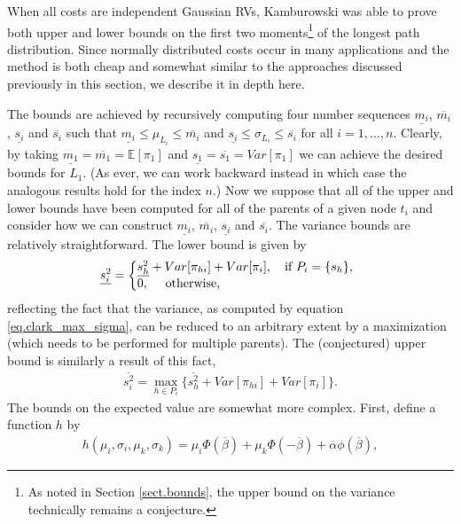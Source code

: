 \documentclass[12pt]{article}
\def\E{\mathbb{E}}
\begin{document}
When all costs are independent Gaussian RVs, Kamburowski was able to prove both upper and lower bounds on the first two moments\footnote{As noted in Section \ref{sect.bounds}, the upper bound on the variance technically remains a conjecture.} of the longest path distribution. Since normally distributed costs occur in many applications and the method is both cheap and somewhat similar to the approaches discussed previously in this section, we describe it in depth here.

The bounds are achieved by recursively computing four number sequences $\underline{m_i}$, $\overline{m_i}$, $\underline{s_i}$ and  $\overline{s_i}$ such that $\underline{m_i} \leq \mu_{L_i} \leq \overline{m_i}$ and $ \underline{s_i} \leq \sigma_{L_i} \leq \overline{s_i}$ for all $i = 1, \dots, n$. Clearly, by taking $\underline{m_1} = \overline{m_1} = \E[\pi_1]$ and $\underline{s_1} = \overline{s_1} = Var[\pi_1]$ we can achieve the desired bounds for $L_1$. (As ever, we can work backward instead in which case the analogous results hold for the index $n$.) Now we suppose that all of the upper and lower bounds have been computed for all of the parents of a given node $t_i$ and consider how we can construct  $\underline{m_i}$, $\overline{m_i}$, $\underline{s_i}$ and  $\overline{s_i}$. The variance bounds are relatively straightforward. The lower bound is given by
\begin{equation}
\underline{s_i^2} =\left\{
\begin{array}{@{}ll@{}}
\underline{s_h^2} + Var[\pi_{hi}] + Var[\pi_{i}], \quad  \text{if $P_i = \{s_h\}$,} \\
0,  \quad \text{ otherwise},
\end{array}\right.
\label{eq.si_under}
\end{equation}
reflecting the fact that the variance, as computed by equation \eqref{eq.clark_max_sigma}, can be reduced to an arbitrary extent by a maximization (which needs to be performed for multiple parents). The (conjectured) upper bound is similarly a result of this fact,
\begin{align}
  \label{eq.si_over}
  \overline{s_i^2} = \max_{h \in P_i}\{ \overline{s_h^2} + Var[\pi_{hi}] + Var[\pi_{i}]\}.
\end{align}
The bounds on the expected value are somewhat more complex. First, define a function $h$ by
\begin{align*}
  h(\mu_i, \sigma_i, \mu_k, \sigma_k) = \mu_i \Phi(\overline{\beta}) + \mu_k \Phi(-\overline{\beta}) + \overline{\alpha} \phi(\overline{\beta}),
\end{align*}
\end{document}
